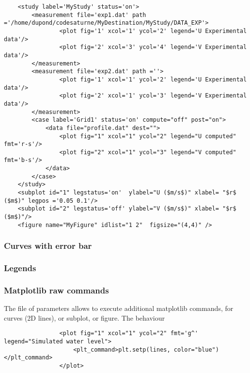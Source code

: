 \documentclass[a4paper,10pt,twoside]{article}
\begin{document}
\begin{verbatim}
    <study label='MyStudy' status='on'>
        <measurement file='exp1.dat' path ='/home/dupond/codesaturne/MyDestination/MyStudy/DATA_EXP'>
                <plot fig='1' xcol='1' ycol='2' legend='U Experimental data'/>
                <plot fig='2' xcol='3' ycol='4' legend='V Experimental data'/>
        </measurement>
        <measurement file='exp2.dat' path =''>
                <plot fig='1' xcol='1' ycol='2' legend='U Experimental data'/>
                <plot fig='2' xcol='1' ycol='3' legend='V Experimental data'/>
        </measurement>
        <case label='Grid1' status='on' compute="off" post="on">
            <data file="profile.dat" dest="">
                <plot fig="1" xcol="1" ycol="2" legend="U computed" fmt='r-s'/>
                <plot fig="2" xcol="1" ycol="3" legend="V computed" fmt='b-s'/>
            </data>
        </case>
    </study>
    <subplot id="1" legstatus='on'  ylabel="U ($m/s$)" xlabel= "$r$ ($m$)" legpos ='0.05 0.1'/>
    <subplot id="2" legstatus='off' ylabel="V ($m/s$)" xlabel= "$r$ ($m$)"/>
    <figure name="MyFigure" idlist="1 2"  figsize="(4,4)" />
\end{verbatim}

\subsubsection{Curves with error bar}


\subsubsection{Legends}



\subsubsection{Matplotlib raw commands}
The file of parameters allows to execute additional matplotlib commands,
for curves (2D lines), or subplot, or figure.
The behaviour 



\begin{verbatim}
                <plot fig="1" xcol="1" ycol="2" fmt='g^' legend="Simulated water level">
                    <plt_command>plt.setp(lines, color="blue")</plt_command>
                </plot>
\end{verbatim}
\end{document}
